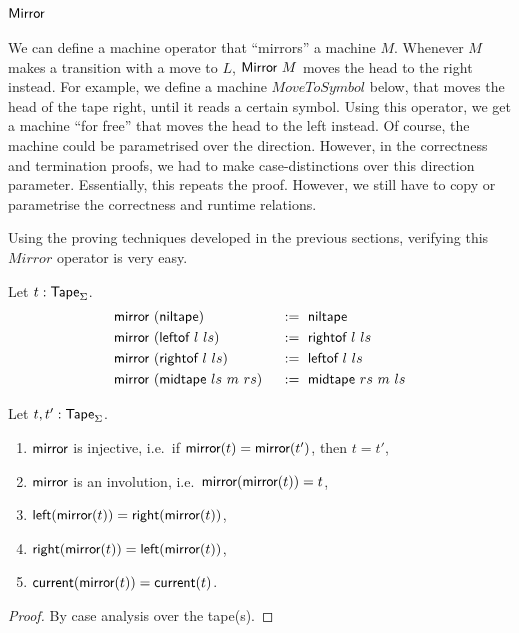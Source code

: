 \section{$\textsf{Mirror}$}
\label{sec:mirror}

We can define a machine operator that ``mirrors'' a machine $M$.  Whenever $M$ makes a transition with a move to $L$, $\textsf{Mirror}~M$ moves the head
to the right instead.  For example, we define a machine $MoveToSymbol$ below, that moves the head of the tape right, until it reads a certain symbol.
Using this operator, we get a machine ``for free'' that moves the head to the left instead.  Of course, the machine could be parametrised over the
direction.  However, in the correctness and termination proofs, we had to make case-distinctions over this direction parameter.  Essentially, this
repeats the proof.  However, we still have to copy or parametrise the correctness and runtime relations.

Using the proving techniques developed in the previous sections, verifying this $Mirror$ operator is very easy.

\begin{definition}
  \label{def:mirror_tape}
  Let $t : \textsf{Tape}_\Sigma$.
  \begin{alignat*}{2}
    & \textsf{mirror}~(\textsf{niltape})         &&~:=~ \textsf{niltape} \\
    & \textsf{mirror}~(\textsf{leftof}~l~ls)     &&~:=~ \textsf{rightof}~l~ls \\
    & \textsf{mirror}~(\textsf{rightof}~l~ls)    &&~:=~ \textsf{leftof}~l~ls \\
    & \textsf{mirror}~(\textsf{midtape}~ls~m~rs) &&~:=~ \textsf{midtape}~rs~m~ls
  \end{alignat*}
\end{definition}
\begin{lemma}
  \label{lem:mirror}
  Let $t,t':\textsf{Tape}_\Sigma$.
  \begin{enumerate}
  \item \label{lem:mirror_tape_injective}
    $\textsf{mirror}$ is injective, i.e.\ if $\textsf{mirror}(t)=\textsf{mirror}(t')$, then $t=t'$,
  \item \label{lem:mirror_tape_involution}
    $\textsf{mirror}$ is an involution, i.e.\ $\textsf{mirror}(\textsf{mirror}(t))=t$,
  \item \label{lem:mirror_left}
    $\textsf{left}(\textsf{mirror}(t)) = \textsf{right}(\textsf{mirror}(t))$,
  \item \label{lem:mirror_right}
    $\textsf{right}(\textsf{mirror}(t)) = \textsf{left}(\textsf{mirror}(t))$,
  \item \label{lem:mirror_current}
    $\textsf{current}(\textsf{mirror}(t)) = \textsf{current}(t)$.
  \end{enumerate}
\end{lemma}
\begin{proof}
  By case analysis over the tape(s).
\end{proof}


